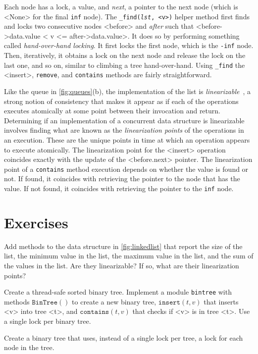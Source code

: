 \documentclass{report}
\begin{document}
%
Each node has a lock, a value, and \textit{next}, a pointer to the next node
(which is <{None}> for the final \texttt{inf} node).
The \texttt{\_find(\textit{lst}, <{v}>)} helper method first
finds and locks two consecutive nodes <{before}> and \textit{after}
such that <{before->data.value < v <= after->data.value}>.
It does so by performing something called \emph{hand-over-hand locking}.
It first locks the first node, which is the \texttt{-inf} node.
Then, iteratively, it obtains a lock on the next node and release the
lock on the last one, and so on, similar to climbing a tree
hand-over-hand.
Using \texttt{\_find} the <{insert}>, \texttt{remove}, and \texttt{contains}
methods are fairly straightforward.

%
Like the queue in \autoref{fig:queues}(b), the implementation of the list is
\emph{linearizable}~\cite{HW90},
%
a strong notion of consistency that
makes it appear as if each of the operations executes atomically at
some point between their invocation and return.
Determining if an implementation of a concurrent data structure
is linearizable involves finding what are known as the
\emph{linearization points}
%
of the operations in an execution.  These are the unique
points in time at which an operation appears to execute atomically.
The linearization point for the <{insert}> operation coincides exactly with the update
of the <{before.next}> pointer.
The linearization point of a \texttt{contains} method
execution depends on whether the value is found or not.
If found, it coincides with retrieving the pointer to the node
that has the value.
If not found, it coincides with retrieving the pointer to the
\texttt{inf} node.

\section*{Exercises}
\begin{problems}
\item Add methods to the data structure in \autoref{fig:linkedlist}
that report the size of the list, the minimum value in the
list, the maximum value in the list, and the sum of the values in the list.
Are they linearizable?  If so, what are their linearization points?
\item Create a thread-safe sorted binary tree.  Implement a module \texttt{bintree}
with methods
$\mathtt{BinTree}()$ to create a new binary tree, $\mathtt{insert}(t, v)$ that inserts <{v}> into
tree <{t}>, and $\mathtt{contains}(t, v)$ that checks if <{v}> is in tree <{t}>.  Use a single
lock per binary tree.
\item Create a binary tree that uses, instead of a single lock per tree,
a lock for each node in the tree.
\end{problems}
\end{document}
